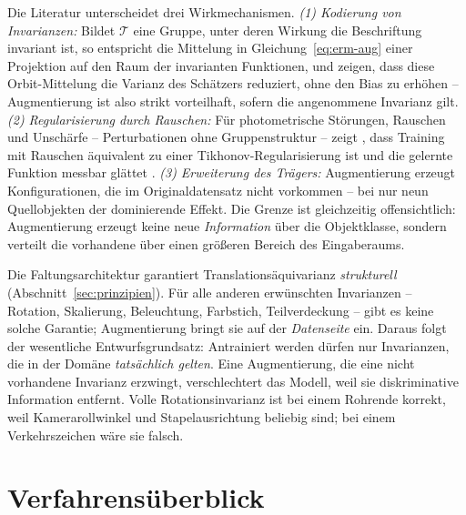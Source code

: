 Die Literatur unterscheidet drei Wirkmechanismen. \emph{(1) Kodierung von
Invarianzen:} Bildet $\mathcal{T}$ eine Gruppe, unter deren Wirkung die
Beschriftung invariant ist, so entspricht die Mittelung in
Gleichung~\eqref{eq:erm-aug} einer Projektion auf den Raum der invarianten
Funktionen, und \textcite{chen2020group} zeigen, dass diese Orbit-Mittelung die
Varianz des Schätzers reduziert, ohne den Bias zu erhöhen -- Augmentierung ist
also strikt vorteilhaft, sofern die angenommene Invarianz gilt.
\emph{(2) Regularisierung durch Rauschen:} Für photometrische Störungen, Rauschen
und Unschärfe -- Perturbationen ohne Gruppenstruktur -- zeigt
\textcite{bishop1995}, dass Training mit Rauschen äquivalent zu einer
Tikhonov-Regularisierung ist und die gelernte Funktion messbar glättet
\parencite[vgl.\ auch][]{dao2019}. \emph{(3) Erweiterung des Trägers:}
Augmentierung erzeugt Konfigurationen, die im Originaldatensatz nicht vorkommen --
bei nur neun Quellobjekten der dominierende Effekt. Die Grenze ist gleichzeitig
offensichtlich: Augmentierung erzeugt keine neue \emph{Information} über die
Objektklasse, sondern verteilt die vorhandene über einen größeren Bereich des
Eingaberaums.

 Die Faltungsarchitektur garantiert
Translationsäquivarianz \emph{strukturell}
(Abschnitt~\ref{sec:prinzipien}). Für alle anderen erwünschten Invarianzen --
Rotation, Skalierung, Beleuchtung, Farbstich, Teilverdeckung -- gibt es keine
solche Garantie; Augmentierung bringt sie auf der \emph{Datenseite} ein. Daraus
folgt der wesentliche Entwurfsgrundsatz: Antrainiert werden dürfen nur
Invarianzen, die in der Domäne \emph{tatsächlich gelten}. Eine Augmentierung, die
eine nicht vorhandene Invarianz erzwingt, verschlechtert das Modell, weil sie
diskriminative Information entfernt. Volle Rotationsinvarianz ist bei einem
Rohrende korrekt, weil Kamerarollwinkel und Stapelausrichtung beliebig sind; bei
einem Verkehrszeichen wäre sie falsch.

\section{Verfahrensüberblick}
\label{sec:augtaxonomie}

